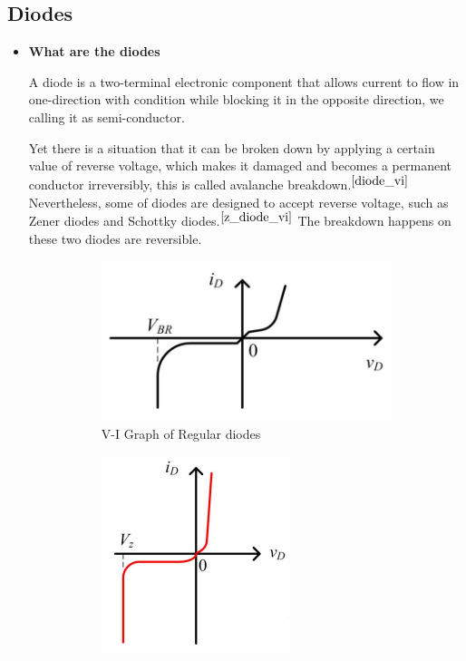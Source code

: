    \subsection{Diodes}
    \FloatBarrier
        \begin{itemize}
            \item \textbf{What are the diodes}\par
                A diode is a two-terminal electronic component that allows current to flow in one-direction with condition while blocking it in the opposite direction, we calling it as semi-conductor.\par
                Yet there is a situation that it can be broken down by applying a certain value of reverse voltage, which makes it damaged and becomes a permanent conductor irreversibly, this is called avalanche breakdown.$^{\ref{diode_vi}}$ Nevertheless, some of diodes are designed to accept reverse voltage, such as Zener diodes and Schottky diodes.$^{\ref{z_diode_vi}}$ The breakdown happens on these two diodes are reversible. \par
                \begin{figure}[h]
                    \centering
                    \begin{subfigure}[h]{0.45\textwidth}
                        \centering
                        \includegraphics[width=0.9\linewidth]{Lab01/Lab1_diode_vi.png}
                        \caption{V-I Graph of Regular diodes}
                        \label{diode_vi}
                    \end{subfigure}
                    \hfill
                    \begin{subfigure}[h]{0.45\textwidth}
                        \centering
                        \includegraphics[width=0.6\linewidth]{Lab01/Lab1_zener_diode_vi.png}

\end{subfigure}
\end{figure}
\end{itemize}
